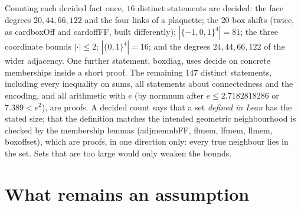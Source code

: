 \documentclass[11pt,a4paper]{article}
\theoremstyle{definition}
\theoremstyle{remark}
\DeclareRobustCommand{\lean}[1]{{\ttfamily\renewcommand{\_}{\textunderscore\allowbreak}#1}}
\begin{document}
Counting each decided fact once, $16$ distinct statements are decided: the face degrees $20,44,66,122$ and the four links of a plaquette; the $20$ box shifts (twice, as \lean{card\_boxOff} and \lean{card\_offFF}, built differently); $|\{-1,0,1\}^4|=81$; the three coordinate bounds $|\cdot|\le2$; $|\{0,1\}^4|=16$; and the degrees $24,44,66,122$ of the wider adjacency. One further statement, \lean{box\_diag}, uses \lean{decide} on concrete memberships inside a short proof. The remaining $147$ distinct statements, including every inequality on sums, all statements about connectedness and the encoding, and all arithmetic with $e$ (by \lean{norm\_num} after $e\le2.7182818286$ or $7.389<e^2$), are proofs. A decided count says that a set \emph{defined in Lean} has the stated size; that the definition matches the intended geometric neighbourhood is checked by the membership lemmas (\lean{adj\_mem\_nbFF}, \lean{fl\_mem}, \lean{lf\_mem}, \lean{ll\_mem}, \lean{box\_offset}), which are proofs, in one direction only: every true neighbour lies in the set. Sets that are too large would only weaken the bounds.

\section{What remains an assumption}\label{sec:assumptions}
\end{document}
